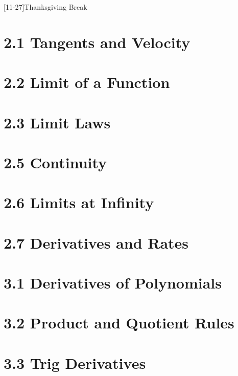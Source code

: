 \documentclass[
	landscape    = true,
	lecture-caps = {1.0, 1.0, 1.0},
	quiz-days    = F,
]{schedule}
\begin{document}
\maketitle
\begin{schedule}

	[11-27]{Thanksgiving Break}


	\syllabus
	\section{2.1 Tangents and Velocity}
	\section{2.2 Limit of a Function}
	\section{2.3 Limit Laws}
	\section{2.5 Continuity}
	\section[2]{2.6 Limits at Infinity}   %
	\section{2.7 Derivatives and Rates}
	\examreview
	\exam[noquiz]

	\section{3.1 Derivatives of Polynomials}
	\section{3.2 Product and Quotient Rules}
	\section{3.3 Trig Derivatives}

\end{schedule}
\end{document}
